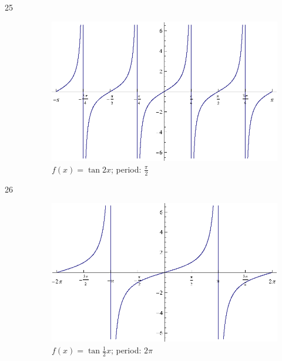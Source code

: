 \documentclass{exam}
\begin{document}
\begin{description}
      \item[25]
        \begin{figure}[H]
          \centering
          \includegraphics[scale=0.9]{exercise25.eps}
          \caption{$f(x) = \tan 2x$; period: $\frac{\pi}{2}$}
        \end{figure}

      \item[26]
        \begin{figure}[H]
          \centering
          \includegraphics[scale=0.9]{exercise26.eps}
          \caption{$f(x) = \tan \frac{1}{2} x $; period: $2 \pi$}
        \end{figure}


\end{description}
\end{document}

